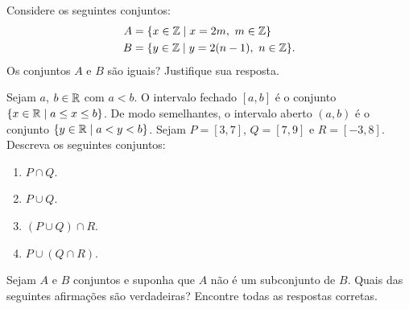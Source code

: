 \documentclass[12pt]{exam}
\begin{document}
    \vspace{.3cm}

    \questao{} Considere os seguintes conjuntos:
    \begin{align*}
        A &= \{x \in \mathbb{Z} \mid x = 2m,\ m \in \mathbb{Z}\}\\
        B &= \{y \in \mathbb{Z} \mid y = 2(n - 1),\ n \in \mathbb{Z}\}.
    \end{align*}
    Os conjuntos $A$ e $B$ são iguais? Justifique sua resposta.

    \vspace{.3cm}

    \questao{} Sejam $a$, $b \in \mathbb{R}$ com $a < b$. O intervalo fechado $[a, b]$ é o conjunto $\{x \in \mathbb{R} \mid a \le x \le b\}$. De modo semelhantes, o intervalo aberto $(a, b)$ é o conjunto $\{y \in \mathbb{R} \mid a < y < b\}$. Sejam $P = [3, 7]$, $Q = [7,9]$ e $R = [-3, 8]$. Descreva os seguintes conjuntos:
    \begin{enumerate}[label={\alph*})]
        \item $P \cap Q$.

        \item $P \cup Q$.

        \item $(P \cup Q) \cap R$.

        \item $P \cup (Q \cap R)$.
    \end{enumerate}

    \vspace{.3cm}

    \questao{} Sejam $A$ e $B$ conjuntos e suponha que $A$ não é um subconjunto de $B$. Quais das seguintes afirmações são verdadeiras? Encontre todas as respostas corretas.
\end{document}
